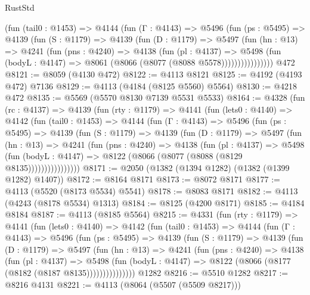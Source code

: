 \begin{lexlean}{RustStd}
\begin{coremodule}
            (fun (tail0 : @1453) =>
            @4144
              (fun (Γ : @4143) =>
              @5496
                (fun (ps : @5495) =>
                @4139
                  (fun (S : @1179) =>
                  @4139
                    (fun (D : @1179) =>
                    @5497
                      (fun (hn : @13) =>
                      @4241
                        (fun (pns : @4240) =>
                        @4138
                          (fun (pl : @4137) =>
                          @5498
                            (fun (bodyL : @4147) => @8061 (@8066 (@8077 (@8088 @5578))))))))))))))))
    @472
@8121 := @8059 (@4130 @472)
@8122 := @4113 @8121
@8125 := @4192 (@4193 @472) @7136
@8129 := @4113 (@4184 (@8125 @5560) @5564)
@8130 := @4218 @472
@8135 := @5569 (@5570 @8130 @7139 @5531 @5533)
@8164 := @4328
    (fun (rc : @4137) =>
    @4139
      (fun (rty : @1179) =>
      @4141
        (fun (lets0 : @4140) =>
        @4142
          (fun (tail0 : @1453) =>
          @4144
            (fun (Γ : @4143) =>
            @5496
              (fun (ps : @5495) =>
              @4139
                (fun (S : @1179) =>
                @4139
                  (fun (D : @1179) =>
                  @5497
                    (fun (hn : @13) =>
                    @4241
                      (fun (pns : @4240) =>
                      @4138
                        (fun (pl : @4137) =>
                        @5498
                          (fun (bodyL : @4147) =>
                          @8122 (@8066 (@8077 (@8088 (@8129 @8135))))))))))))))))
@8171 := @2050 (@1382 (@1394 @1282) (@1382 (@1399 @1282) @1407))
@8172 := @8164 @8171
@8173 := @8072 @8171
@8177 := @4113 (@5520 (@8173 @5534) @5541)
@8178 := @8083 @8171
@8182 := @4113 (@4243 (@8178 @5534) @1313)
@8184 := @8125 (@4200 @8171)
@8185 := @4184 @8184
@8187 := @4113 (@8185 @5564)
@8215 := @4331
    (fun (rty : @1179) =>
    @4141
      (fun (lets0 : @4140) =>
      @4142
        (fun (tail0 : @1453) =>
        @4144
          (fun (Γ : @4143) =>
          @5496
            (fun (ps : @5495) =>
            @4139
              (fun (S : @1179) =>
              @4139
                (fun (D : @1179) =>
                @5497
                  (fun (hn : @13) =>
                  @4241
                    (fun (pns : @4240) =>
                    @4138
                      (fun (pl : @4137) =>
                      @5498
                        (fun (bodyL : @4147) =>
                        @8122 (@8066 (@8177 (@8182 (@8187 @8135)))))))))))))))
    @1282
@8216 := @5510 @1282
@8217 := @8216 @4131
@8221 := @4113 (@8064 (@5507 (@5509 @8217)))

\end{coremodule}
\end{lexlean}
